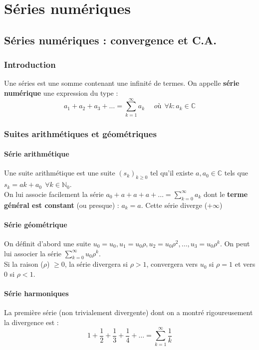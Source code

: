 \documentclass[11pt, a4paper, openany]{book}
\begin{document}
\setcounter{chapter}{10}
\chapter{Séries numériques}
\section{Séries numériques : convergence et C.A.}
\subsection{Introduction}
Une séries est une somme contenant une infinité de termes. On appelle \textbf{série numérique} une expression du type :
\begin{equation}
	a_1 + a_2 + a_3 + \dots = \sum_{k=1}^\infty a_k\ \ \ \ \ \ où\ \ \forall k : a_k \in \mathbb{C}
\end{equation}
		
\subsection{Suites arithmétiques et géométriques}
\subsubsection{Série arithmétique}
Une suite arithmétique est une suite $(s_k)_{k \geq 0}$ tel qu'il existe $a, a_0 \in \mathbb{C}$ tels que $s_k = ak + a_0\ \ \forall k \in \mathbb{N}_0$.\\
On lui associe facilement la série $a_0 + a + a + a + \dots = \sum_{k=0}^\infty a_k$ dont  le \textbf{terme général est constant} (ou presque) : $a_k = a$.
Cette série diverge ($+\infty$)
		
\subsubsection{Série géométrique}
On définit d'abord une suite $u_0 = u_0, u_1 = u_0\rho, u_2 = u_0\rho^2,\dots, u_3 = u_0\rho^k$. On peut lui associer la série $\sum_{k=0}^\infty u_0\rho^k$.\\
Si la raison ($\rho$) $\geq 0$, la série divergera si $\rho > 1$, convergera vers $u_0$ si $\rho = 1$ et vers $0$ si $\rho < 1$.
		
\subsubsection{Série harmoniques}
La première série (non trivialement divergente) dont on a montré rigoureusement la divergence est :
\begin{equation}
	1 + \frac{1}{2} + \frac{1}{3} + \frac{1}{4} + \dots = \sum_{k=1}^\infty \frac{1}{k}
\end{equation}
		
\end{document}

